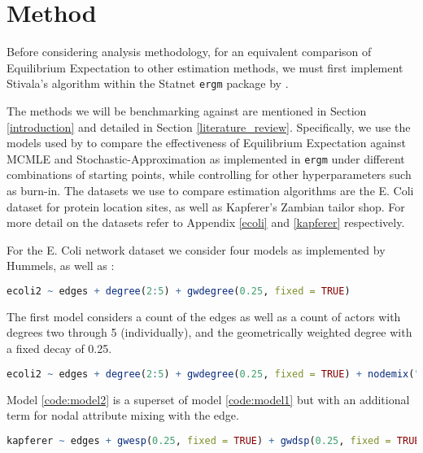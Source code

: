 \section{Method}
\label{sec:method}

Before considering analysis methodology, for an equivalent comparison of Equilibrium Expectation to other estimation methods, we must first implement Stivala's algorithm within the Statnet \texttt{ergm} package by \cite{ergm}. 


The methods we will be benchmarking against are mentioned in Section \ref{introduction} and detailed in Section \ref{literature_review}. Specifically, we use the models used by \cite{hummels2012} to compare the effectiveness of Equilibrium Expectation against MCMLE and Stochastic-Approximation as implemented in \texttt{ergm} under different combinations of starting points, while controlling for other hyperparameters such as burn-in. The datasets we use to compare estimation algorithms are the E. Coli dataset for protein location sites, as well as Kapferer's Zambian tailor shop. For more detail on the datasets refer to Appendix \ref{ecoli} and \ref{kapferer} respectively.

For the E. Coli network dataset we consider four models as implemented by Hummels, as well as \cite{krivitsky2017}:

\begin{lstlisting}[language=R, label = {code:model1}]
ecoli2 ~ edges + degree(2:5) + gwdegree(0.25, fixed = TRUE)
\end{lstlisting}

The first model considers a count of the edges as well as a count of actors with degrees two through 5 (individually), and the geometrically weighted degree with a fixed decay of 0.25.

\begin{lstlisting}[language=R, label = {code:model2}]
ecoli2 ~ edges + degree(2:5) + gwdegree(0.25, fixed = TRUE) + nodemix("self", base = 1)
\end{lstlisting}

Model \ref{code:model2} is a superset of model \ref{code:model1} but with an additional term for nodal attribute mixing with the edge.

\begin{lstlisting}[language=R, label = {code:model3}]
kapferer ~ edges + gwesp(0.25, fixed = TRUE) + gwdsp(0.25, fixed = TRUE)
\end{lstlisting}


